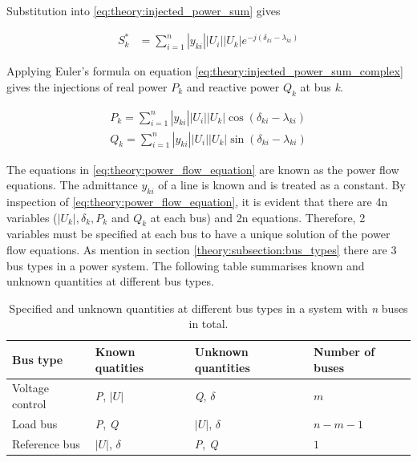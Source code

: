 \documentclass[class=book, crop=false]{standalone}
\begin{document}
Substitution into \eqref{eq:theory:injected_power_sum} gives 

\begin{equation}
    \begin{aligned}\label{eq:theory:injected_power_sum_complex}
    S^{*}_{k} &= \sum_{i=1}^{n}|y_{ki}||U_{i}||U_{k}|e^{-j(\delta_{ki}-\lambda_{ki})}
    \end{aligned} 
\end{equation}



Applying Euler's formula on equation \eqref{eq:theory:injected_power_sum_complex} gives the injections of real power $P_{k}$ and reactive power $Q_{k}$ at bus \textit{k}.

\begin{equation}
    \begin{aligned}\label{eq:theory:power_flow_equation}
    P_{k} =  \sum_{i=1}^{n}|y_{ki}||U_{i}||U_{k}|\cos{(\delta_{ki}-\lambda_{ki})}
    \\
    Q_{k} =  \sum_{i=1}^{n}|y_{ki}||U_{i}||U_{k}|\sin{(\delta_{ki}-\lambda_{ki})}
    \end{aligned} 
\end{equation}

The equations in \eqref{eq:theory:power_flow_equation} are known as the power flow equations. The admittance $y_{ki}$ of a line is known and is treated as a constant. By inspection of \eqref{eq:theory:power_flow_equation}, it is evident that there are 4n variables ($|U_{k}|,\delta_{k}, P_{k}$ and $Q_{k}$ at each bus) and 2n equations. Therefore, 2 variables must be specified at each bus to have a unique solution of the power flow equations. 
As mention in section \ref{theory:subsection:bus_types} there are 3 bus types in a power system. The following table summarises known and unknown quantities at different bus types.


\begin{table}[h]
\centering
\caption{Specified and unknown quantities at different bus types in a system with \textit{n} buses in total. }
\label{table:large_deals}
\begin{tabular}{l|lll}

Bus type  & Known quatities   & Unknown quantities & Number of buses \\ \hline
Voltage control      & \textit{P}, $|U|$   &  \textit{Q}, $\delta$ & $m$   \\ 
Load bus    & \textit{P}, \textit{Q}    & $|U|$, $\delta$ & $n-m-1$ \\ 
Reference bus & $|U|$, $\delta$ & \textit{P}, \textit{Q}  & $1$ \\ \hline
\end{tabular}
\end{table}
\end{document}
